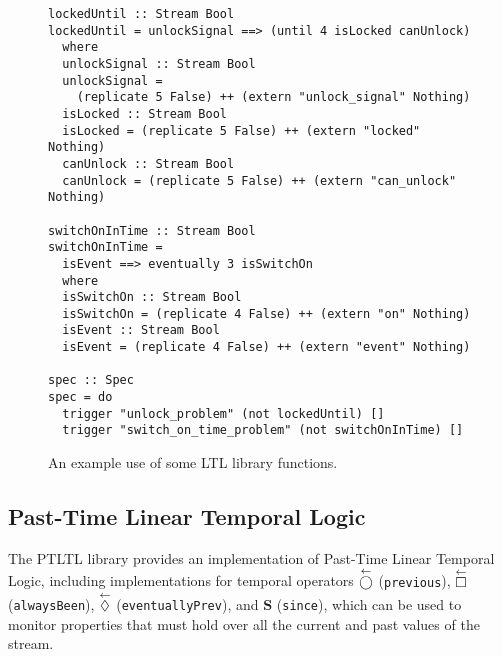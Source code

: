 \begin{figure*}[!htb]
\begin{lstlisting}[frame=none]
lockedUntil :: Stream Bool
lockedUntil = unlockSignal ==> (until 4 isLocked canUnlock)
  where
  unlockSignal :: Stream Bool
  unlockSignal =
    (replicate 5 False) ++ (extern "unlock_signal" Nothing)
  isLocked :: Stream Bool
  isLocked = (replicate 5 False) ++ (extern "locked" Nothing)
  canUnlock :: Stream Bool
  canUnlock = (replicate 5 False) ++ (extern "can_unlock" Nothing)

switchOnInTime :: Stream Bool
switchOnInTime =
  isEvent ==> eventually 3 isSwitchOn
  where
  isSwitchOn :: Stream Bool
  isSwitchOn = (replicate 4 False) ++ (extern "on" Nothing)
  isEvent :: Stream Bool
  isEvent = (replicate 4 False) ++ (extern "event" Nothing)

spec :: Spec
spec = do
  trigger "unlock_problem" (not lockedUntil) []
  trigger "switch_on_time_problem" (not switchOnInTime) []
\end{lstlisting}
\caption{An example use of some LTL library functions.}
\label{fig:ltl_example}
\end{figure*}

\subsection{Past-Time Linear Temporal Logic}
The PTLTL library provides an implementation of Past-Time Linear Temporal Logic,
including implementations for temporal operators
$\overset{\leftarrow}{\bigcirc}$ ({\tt previous}), $\overset{\leftarrow}{\square}$
({\tt alwaysBeen}), $\overset{\leftarrow}{\lozenge}$ ({\tt eventuallyPrev}),
and $\mathbf{S}$ ({\tt since}), which can be used to monitor
properties that must hold over all the current and past values of the stream.

